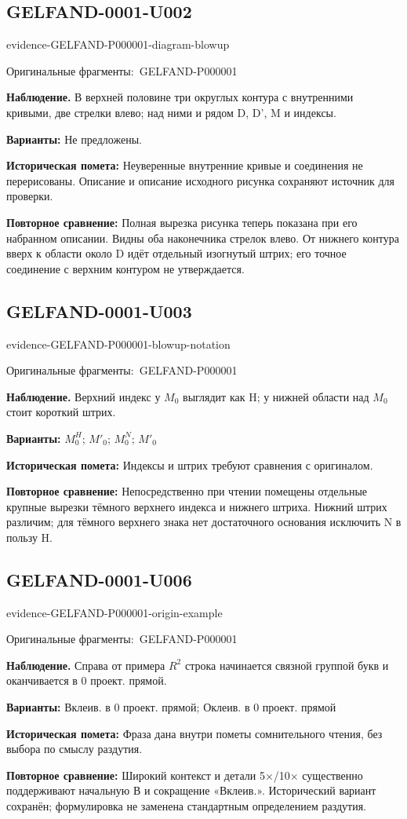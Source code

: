 \documentclass[11pt]{article}
\newcommand{\EvidenceBlock}[4]{%
 \par\smallskip\noindent\begin{minipage}{\linewidth}
 \begin{minipage}[t]{.47\linewidth}\vspace{0pt}\centering
 \csname evidence-#1-#2\endcsname\par
 {\scriptsize\SourceCropCaption\ #1}\par
 \end{minipage}\hfill
 \begin{minipage}[t]{.49\linewidth}\vspace{0pt}\raggedright
 {\small\color{orange!65!black}\textbf{#4} #3}\par
 \end{minipage}
 \end{minipage}\par\smallskip}
\newcommand{\SourceCropCaption}{Оригинальные фрагменты:}\newcommand{\ReadingCaption}{Сомнительное чтение.}\newcommand{\IncompleteCaption}{Неразобранный фрагмент.}\newcommand{\DiagramCaption}{Рисунок и набранное описание.}
\begin{document}
\subsection*{GELFAND-0001-U002}
\EvidenceBlock{GELFAND-P000001}{diagram-blowup}{В верхней половине три округлых контура с внутренними кривыми, две стрелки влево; над ними и рядом D, D', M и индексы.}{Наблюдение.}
\par\smallskip\noindent\textbf{Варианты: } Не предложены.\par
\par\smallskip\noindent\textbf{Историческая помета: } Неуверенные внутренние кривые и соединения не перерисованы. Описание и описание исходного рисунка сохраняют источник для проверки.\par
\par\smallskip\noindent\textbf{Повторное сравнение: } Полная вырезка рисунка теперь показана при его набранном описании. Видны оба наконечника стрелок влево. От нижнего контура вверх к области около D идёт отдельный изогнутый штрих; его точное соединение с верхним контуром не утверждается.\par
\subsection*{GELFAND-0001-U003}
\EvidenceBlock{GELFAND-P000001}{blowup-notation}{Верхний индекс у \(M_0\) выглядит как H; у нижней области над \(M_0\) стоит короткий штрих.}{Наблюдение.}
\par\smallskip\noindent\textbf{Варианты: } \(M_0^H\); \(M'_0\); \(M_0^N\); \(M'_0\)\par
\par\smallskip\noindent\textbf{Историческая помета: } Индексы и штрих требуют сравнения с оригиналом.\par
\par\smallskip\noindent\textbf{Повторное сравнение: } Непосредственно при чтении помещены отдельные крупные вырезки тёмного верхнего индекса и нижнего штриха. Нижний штрих различим; для тёмного верхнего знака нет достаточного основания исключить N в пользу H.\par
\subsection*{GELFAND-0001-U006}
\EvidenceBlock{GELFAND-P000001}{origin-example}{Справа от примера \(R^2\) строка начинается связной группой букв и оканчивается в 0 проект. прямой.}{Наблюдение.}
\par\smallskip\noindent\textbf{Варианты: } Вклеив. в 0 проект. прямой; Оклеив. в 0 проект. прямой\par
\par\smallskip\noindent\textbf{Историческая помета: } Фраза дана внутри пометы сомнительного чтения, без выбора по смыслу раздутия.\par
\par\smallskip\noindent\textbf{Повторное сравнение: } Широкий контекст и детали 5×/10× существенно поддерживают начальную В и сокращение «Вклеив.». Исторический вариант сохранён; формулировка не заменена стандартным определением раздутия.\par
\end{document}
